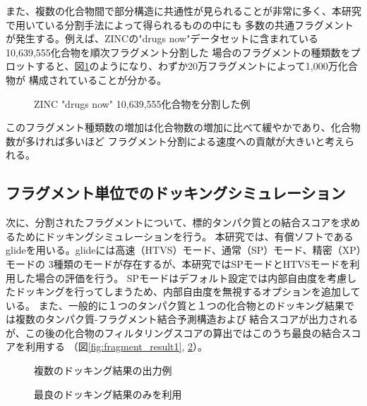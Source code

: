 また、複数の化合物間で部分構造に共通性が見られることが非常に多く、本研究で用いている分割手法によって得られるものの中にも
多数の共通フラグメントが発生する。例えば、ZINCの"drugs now"データセットに含まれている10,639,555化合物を順次フラグメント分割した
場合のフラグメントの種類数をプロットすると、図\ref{fig:decomposition_amount}のようになり、わずか20万フラグメントによって1,000万化合物が
構成されていることが分かる。
\begin{figure}[htp]
 \begin{center}
  \caption{ZINC "drugs now" 10,639,555化合物を分割した例}
  \label{fig:decomposition_amount}
 \end{center}
\end{figure}
このフラグメント種類数の増加は化合物数の増加に比べて緩やかであり、化合物数が多ければ多いほど
フラグメント分割による速度への貢献が大きいと考えられる。

\subsection{フラグメント単位でのドッキングシミュレーション}
次に、分割されたフラグメントについて、標的タンパク質との結合スコアを求めるためにドッキングシミュレーションを行う。
本研究では、有償ソフトであるglide\cite{Friesner2004}を用いる。glideには高速（HTVS）モード、通常（SP）モード、精密（XP）モードの
3種類のモードが存在するが、本研究ではSPモードとHTVSモードを利用した場合の評価を行う。
SPモードはデフォルト設定では内部自由度を考慮したドッキングを行ってしまうため、内部自由度を無視するオプションを追加している。
また、一般的に１つのタンパク質と１つの化合物とのドッキング結果では複数のタンパク質-フラグメント結合予測構造および
結合スコアが出力されるが、この後の化合物のフィルタリングスコアの算出ではこのうち最良の結合スコアを利用する
（図\ref{fig:fragment_result1}, \ref{fig:fragment_result2}）。

\begin{figure}[bt]
\begin{minipage}{0.5\hsize}
 \begin{center}
  \caption{複数のドッキング結果の出力例}
  \label{fig:fragment_result1}
 \end{center}
\end{minipage}
\begin{minipage}{0.5\hsize}
 \begin{center}
  \caption{最良のドッキング結果のみを利用}
  \label{fig:fragment_result2}
 \end{center}
\end{minipage}
\end{figure}


